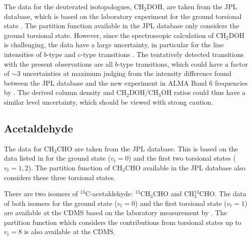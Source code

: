 \documentclass[linenumbers, twocolumn, twocolappendix, astrosymb, times]{aastex631}
\newcommand{\methanol}{CH$_3$OH\xspace}
\newcommand{\acetaldehyde}{CH$_3$CHO\xspace}
\begin{document}
The data for the deuterated isotopologues, CH$_2$DOH, are taken from the JPL database, which is based on the laboratory experiment for the ground torsional state \citep{Pearson2012}. The partition function available in the JPL database only considers the ground torsional state. \textrm{However, since the spectroscopic calculation of CH$_2$DOH is challenging, the data have a large uncertainty, in particular for the line intensities of $b$-type and $c$-type transitions \citep{Pearson2012, Oyama2023}. The tentatively detected transitions with the present observations are all $b$-type transitions, which could have a factor of $\sim3$ uncertainties at maximum judging from the intensity difference found between the JPL database and the new experiment in ALMA Band 6 frequencies by \citet{Oyama2023}. The derived column density and CH$_2$DOH/CH$_3$OH ratios could thus have a similar level uncertainty, which should be viewed with strong caution.}


\subsection{Acetaldehyde}
The data for \acetaldehyde are taken from the JPL database. This is based on the data listed in \citet{Kleiner1996} for the ground state ($v_t = 0$) and the first two torsional states ($v_t = 1, 2$). The partition function of \acetaldehyde available in the JPL database also considers these three torsional states. 

There are two isomers of $^{13}$C-acetaldehyde: $^{13}$CH$_3$CHO and CH$_3^{13}$CHO. The data of both isomers for the ground state ($v_t = 0$) and the first torsional state ($v_t = 1$) are available at the CDMS based on the laboratory measurement by \citep{Margules2015}. The partition function which considers the contributions from torsional states up to $v_t = 8$ is also available at the CDMS.
\end{document}
